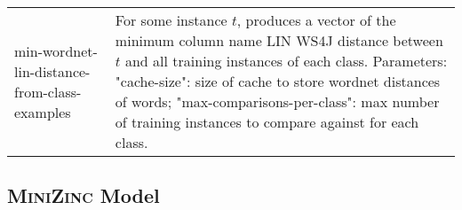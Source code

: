 \documentclass[letterpaper]{article} %
\newcommand{\minizinc}{\textsc{MiniZinc}}
\begin{document}
\begin{table}[t]
\begin{tabular}{p{2.5cm}p{5cm}}
min-wordnet-lin-distance-from-class-examples            & For some instance $t$, produces a vector of the minimum column name
LIN WS4J distance between $t$ and all training instances of each class.
Parameters:
"cache-size": size of cache to store wordnet distances of words; 
"max-comparisons-per-class": max number of training instances to compare
against for each class.\\

\end{tabular}
\end{table}






\clearpage\newpage
\subsection{\minizinc{} Model \label{Ann:MZ}}
\renewcommand{\lstlistingname}{Model}
\end{document}
